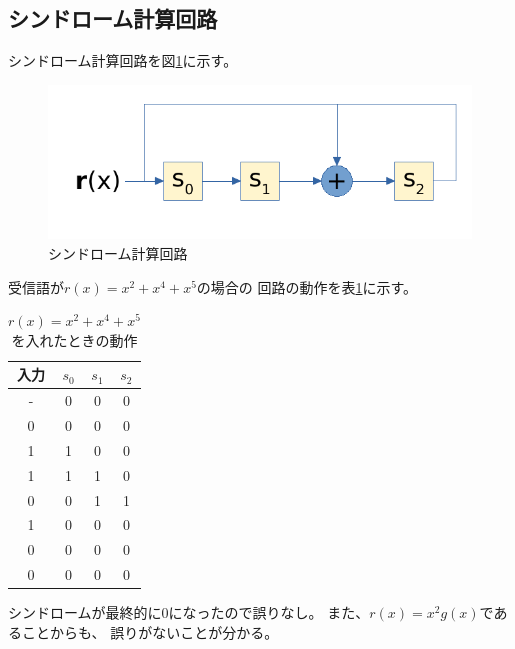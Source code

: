\documentclass[a4paper,11pt]{jsarticle}
\begin{document}
\subsection{シンドローム計算回路}
シンドローム計算回路を図\ref{fig:calc-syndrome-circuit}に示す。
\begin{figure}[htbp]
  \begin{center}
  \includegraphics[scale=1.0]{figures/calc-syndrome-cyclic-7-4.pdf}
  \end{center}
  \caption{シンドローム計算回路
  \label{fig:calc-syndrome-circuit}
  }
\end{figure}
受信語が$r(x)=x^2+x^4+x^5$の場合の
回路の動作を表\ref{table:syndrome-behavior}に示す。
\begin{table}[hbtp]
  \caption{$r(x)=x^2+x^4+x^5$を入れたときの動作}
  \label{table:syndrome-behavior}
  \centering
  \begin{tabular}{c|ccc}
    入力 & $s_0$ & $s_1$ & $s_2$ \\ \hline
    - & 0 & 0 & 0 \\
    0 & 0 & 0 & 0 \\
    1 & 1 & 0 & 0 \\
    1 & 1 & 1 & 0 \\
    0 & 0 & 1 & 1 \\
    1 & 0 & 0 & 0 \\
    0 & 0 & 0 & 0 \\
    0 & 0 & 0 & 0
  \end{tabular}
\end{table}
シンドロームが最終的に0になったので誤りなし。
また、$r(x)=x^2g(x)$であることからも、
誤りがないことが分かる。
\end{document}
